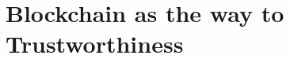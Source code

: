\documentclass[12pt,a4paper,openright,twoside]{book}
\begin{document}
\chapter{Blockchain as the way to Trustworthiness}

\cite{bctcoord-bct4mas2018wi}
\cite{bctcoord-bct4mas2019}
\cite{bctcoordination-information11}
\cite{blockchain-goodtechs2018}
\cite{proactivesc-blockchain2019}
\cite{blockchainmas-applsci10}



\nocite{*} %


\end{document}
